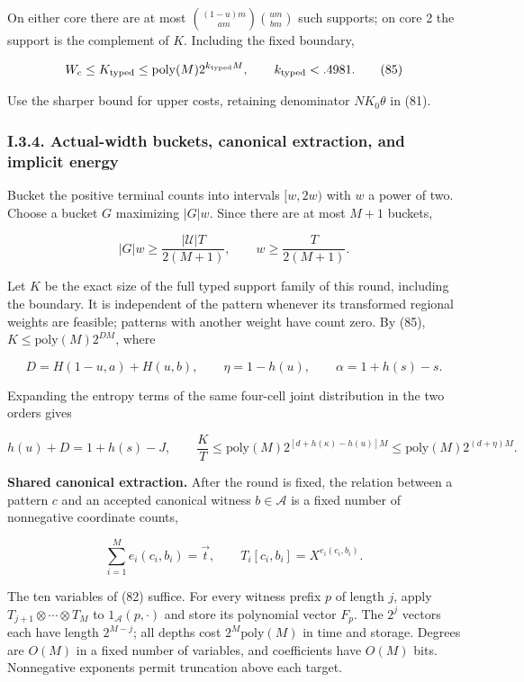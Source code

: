 On either core there are at most \(\binom{(1-u)m}{am}\binom{um}{bm}\) such supports; on core 2 the support is the complement of \(K\). Including the fixed boundary,

\[
W_c\le K_{\rm typed}\le\mathrm{poly}(M)2^{k_{\rm typed}M},
\qquad k_{\rm typed}<.4981.
\tag{85}
\]

Use the sharper bound for upper costs, retaining denominator \(NK_0\theta\) in (81).

\hypertarget{af-a9ec399514-i.3.4.-actual-width-buckets-canonical-extraction-and-implicit-energy}{%
\subsubsection{I.3.4. Actual-width buckets, canonical extraction, and implicit energy}\label{af-a9ec399514-i.3.4.-actual-width-buckets-canonical-extraction-and-implicit-energy}}

Bucket the positive terminal counts into intervals \([w,2w)\) with \(w\) a power of two. Choose a bucket \(G\) maximizing \(|G|w\). Since there are at most \(M+1\) buckets,

\[
|G|w\ge\frac{|\mathcal U|T}{2(M+1)},\qquad
w\ge\frac{T}{2(M+1)}.
\tag{86}
\]

Let \(K\) be the exact size of the full typed support family of this round, including the boundary. It is independent of the pattern whenever its transformed regional weights are feasible; patterns with another weight have count zero. By (85), \(K\le\mathrm{poly}(M)2^{DM}\), where

\[
D=H(1-u,a)+H(u,b),\qquad
\eta=1-h(u),\qquad \alpha=1+h(s)-s.
\tag{87}
\]

Expanding the entropy terms of the same four-cell joint distribution in the two orders gives

\[
h(u)+D=1+h(s)-J,\qquad
\frac KT\le\mathrm{poly}(M)
2^{[d+h(\kappa)-h(u)]M}
\le\mathrm{poly}(M)2^{(d+\eta)M}.
\tag{88}
\]

\textbf{Shared canonical extraction.} After the round is fixed, the relation between a pattern \(c\) and an accepted canonical witness \(b\in\mathcal A\) is a fixed number of nonnegative coordinate counts,

\[
\sum_{i=1}^M e_i(c_i,b_i)=\vec t,
\qquad T_i[c_i,b_i]=X^{e_i(c_i,b_i)}.
\]

The ten variables of (82) suffice. For every witness prefix \(p\) of length \(j\), apply \(T_{j+1}\otimes\cdots\otimes T_M\) to \(1_{\mathcal A}(p,\cdot)\) and store its polynomial vector \(F_p\). The \(2^j\) vectors each have length \(2^{M-j}\); all depths cost \(2^M\mathrm{poly}(M)\) in time and storage. Degrees are \(O(M)\) in a fixed number of variables, and coefficients have \(O(M)\) bits. Nonnegative exponents permit truncation above each target.

